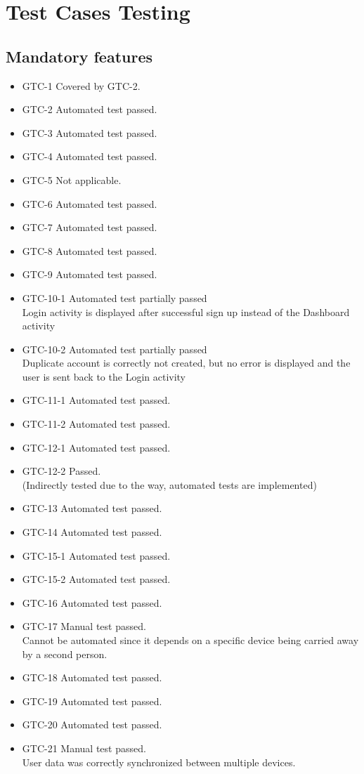 \chapter{Test Cases Testing}

\section{Mandatory features}
\begin{itemize}
	\item{GTC-1} Covered by GTC-2.
	\item{GTC-2} Automated test passed.
	\item{GTC-3} Automated test passed.
	\item{GTC-4} Automated test passed.
	\item{GTC-5} Not applicable.
	\item{GTC-6} Automated test passed.
	\item{GTC-7} Automated test passed.
	\item{GTC-8} Automated test passed.
	\item{GTC-9} Automated test passed.
	\item{GTC-10-1} Automated test partially passed \\ Login activity is displayed after successful sign up instead of the Dashboard activity
	\item{GTC-10-2} Automated test partially passed \\ Duplicate account is correctly not created, but no error is displayed and the user is sent back to the Login activity
	\item{GTC-11-1} Automated test passed.
	\item{GTC-11-2} Automated test passed.
	\item{GTC-12-1} Automated test passed.
	\item{GTC-12-2} Passed. \\ (Indirectly tested due to the way, automated tests are implemented)
	\item{GTC-13} Automated test passed.
	\item{GTC-14} Automated test passed.
	\item{GTC-15-1} Automated test passed.
	\item{GTC-15-2} Automated test passed.
	\item{GTC-16} Automated test passed.
	\item{GTC-17} Manual test passed. \\ Cannot be automated since it depends on a specific device being carried away by a second person.
	\item{GTC-18} Automated test passed.
	\item{GTC-19} Automated test passed.
	\item{GTC-20} Automated test passed.
	\item{GTC-21} Manual test passed. \\ User data was correctly synchronized between multiple devices.
\end{itemize}

